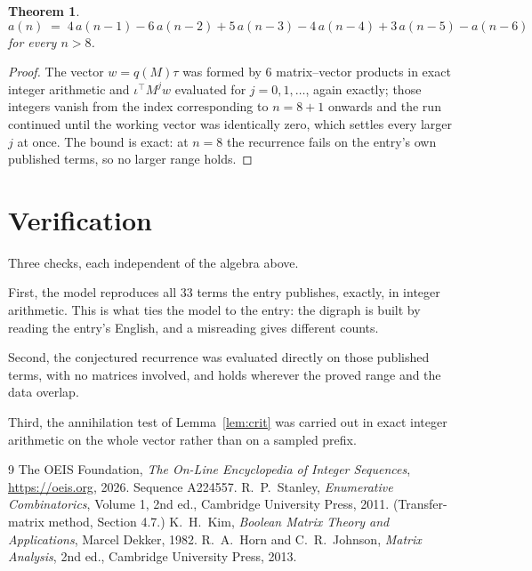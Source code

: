 \documentclass[11pt,a4paper]{article}
\theoremstyle{plain}
\newtheorem{theorem}{Theorem}
\theoremstyle{definition}
\begin{document}
\begin{theorem}
\[
a(n)\;=\;4\,a(n-1) - 6\,a(n-2) + 5\,a(n-3) - 4\,a(n-4) + 3\,a(n-5) - a(n-6)
\]
for every $n>8$.
\end{theorem}

\begin{proof}
The vector $w=q(M)\tau$ was formed by $6$ matrix--vector products in exact integer
arithmetic and $\iota^{\!\top}M^{j}w$ evaluated for $j=0,1,\dots$, again exactly; those
integers vanish from the index corresponding to $n=8+1$ onwards and the run continued
until the working vector was identically zero, which settles every larger $j$ at once. The bound is exact: at $n=8$ the recurrence fails on the entry's own published terms, so no larger range holds.
\end{proof}

\section{Verification}

Three checks, each independent of the algebra above.

First, the model reproduces all $33$ terms the entry publishes, exactly, in integer
arithmetic. This is what ties the model to the entry: the digraph is built by reading the
entry's English, and a misreading gives different counts.

Second, the conjectured recurrence was evaluated directly on those published terms, with no
matrices involved, and holds wherever the proved range and the data overlap.

Third, the annihilation test of Lemma~\ref{lem:crit} was carried out in exact integer
arithmetic on the whole vector rather than on a sampled prefix.

\begin{thebibliography}{9}
 The OEIS Foundation, \emph{The On-Line Encyclopedia of Integer
Sequences}, \url{https://oeis.org}, 2026. Sequence A224557.
 R.~P.~Stanley, \emph{Enumerative Combinatorics}, Volume 1, 2nd ed.,
Cambridge University Press, 2011. (Transfer-matrix method, Section 4.7.)
 K.~H.~Kim, \emph{Boolean Matrix Theory and Applications}, Marcel Dekker,
1982.
 R.~A.~Horn and C.~R.~Johnson, \emph{Matrix Analysis}, 2nd ed., Cambridge
University Press, 2013.
\end{thebibliography}
\end{document}
